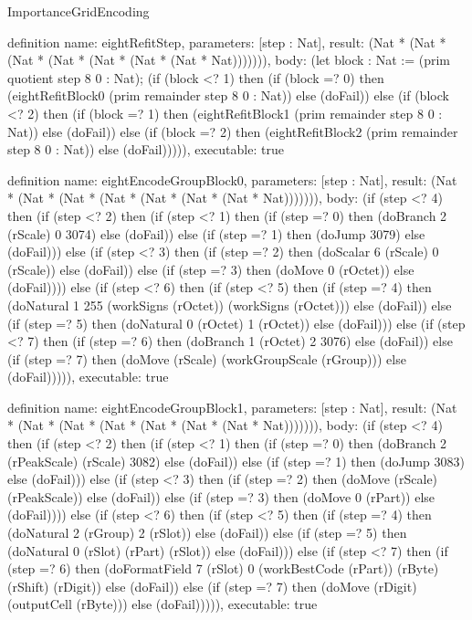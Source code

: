 \begin{lexlean}{ImportanceGridEncoding}
\begin{semanticmodule}
definition{
  name: eightRefitStep,
  parameters: [step : Nat],
  result: (Nat * (Nat * (Nat * (Nat * (Nat * (Nat * (Nat * Nat))))))),
  body: (let block : Nat := (prim quotient step 8 0 : Nat); (if (block <? 1) then
      (if (block =? 0) then (eightRefitBlock0 (prim remainder step 8 0 : Nat)) else (doFail)) else
      (if (block <? 2) then
      (if (block =? 1) then (eightRefitBlock1 (prim remainder step 8 0 : Nat)) else (doFail)) else
      (if (block =? 2) then (eightRefitBlock2 (prim remainder step 8 0 : Nat)) else (doFail))))),
  executable: true
}

definition{
  name: eightEncodeGroupBlock0,
  parameters: [step : Nat],
  result: (Nat * (Nat * (Nat * (Nat * (Nat * (Nat * (Nat * Nat))))))),
  body: (if (step <? 4) then
      (if (step <? 2) then
      (if (step <? 1) then
      (if (step =? 0) then (doBranch 2 (rScale) 0 3074) else (doFail)) else
      (if (step =? 1) then (doJump 3079) else (doFail))) else
      (if (step <? 3) then
      (if (step =? 2) then (doScalar 6 (rScale) 0 (rScale)) else (doFail)) else
      (if (step =? 3) then (doMove 0 (rOctet)) else (doFail)))) else
      (if (step <? 6) then
      (if (step <? 5) then
      (if (step =? 4) then (doNatural 1 255 (workSigns (rOctet)) (workSigns (rOctet))) else (doFail)) else
      (if (step =? 5) then (doNatural 0 (rOctet) 1 (rOctet)) else (doFail))) else
      (if (step <? 7) then
      (if (step =? 6) then (doBranch 1 (rOctet) 2 3076) else (doFail)) else
      (if (step =? 7) then (doMove (rScale) (workGroupScale (rGroup))) else (doFail))))),
  executable: true
}

definition{
  name: eightEncodeGroupBlock1,
  parameters: [step : Nat],
  result: (Nat * (Nat * (Nat * (Nat * (Nat * (Nat * (Nat * Nat))))))),
  body: (if (step <? 4) then
      (if (step <? 2) then
      (if (step <? 1) then
      (if (step =? 0) then (doBranch 2 (rPeakScale) (rScale) 3082) else (doFail)) else
      (if (step =? 1) then (doJump 3083) else (doFail))) else
      (if (step <? 3) then
      (if (step =? 2) then (doMove (rScale) (rPeakScale)) else (doFail)) else
      (if (step =? 3) then (doMove 0 (rPart)) else (doFail)))) else
      (if (step <? 6) then
      (if (step <? 5) then
      (if (step =? 4) then (doNatural 2 (rGroup) 2 (rSlot)) else (doFail)) else
      (if (step =? 5) then (doNatural 0 (rSlot) (rPart) (rSlot)) else (doFail))) else
      (if (step <? 7) then
      (if (step =? 6) then (doFormatField 7 (rSlot) 0 (workBestCode (rPart)) (rByte) (rShift) (rDigit)) else (doFail)) else
      (if (step =? 7) then (doMove (rDigit) (outputCell (rByte))) else (doFail))))),
  executable: true
}


\end{semanticmodule}
\end{lexlean}
